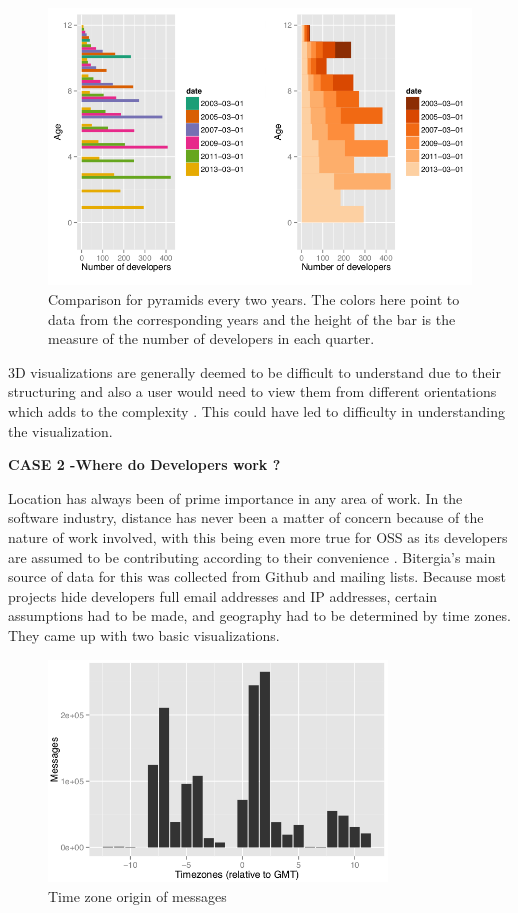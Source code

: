 \documentclass[double,12pt]{beavtex}
\begin{document}
\begin{figure}[!ht]
\centering
\includegraphics[width=130mm]{age1.png}
\caption{Comparison for pyramids every two years. The colors here point to data from the corresponding years and the height of the bar is the measure of the number of developers in each quarter.}
\end{figure}

3D visualizations are generally deemed to be difficult to understand due to their structuring and also a user would need to view them from different orientations which adds to the complexity \cite{james2011}. This could have led to difficulty in understanding the visualization. 

 \textbf{CASE 2 -Where do Developers work ?}

Location has always been of prime importance in any area of work. In the software industry, distance has never been a matter of concern because of the nature of work involved, with this being even more true for OSS as its developers are assumed to be contributing according to their convenience \cite{yuri2010}. Bitergia’s main source of data for this was collected from
Github and mailing lists. Because most projects hide developers full email addresses and IP addresses, certain assumptions had to be made, and geography had to be determined by time zones. They came up with two basic visualizations.

\begin{figure}[!ht]
\centering
\includegraphics[width=90mm]{work1.png}
\caption{Time zone origin of messages}
\end{figure}
\end{document}
